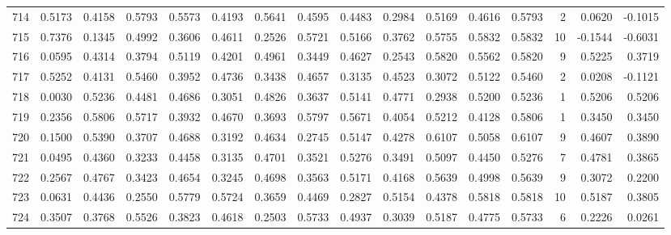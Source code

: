 \begin{tabular}{lrrrrrrrrrrrrrrr}
714 &      0.5173 &  0.4158 &  0.5793 &  0.5573 &  0.4193 &  0.5641 &  0.4595 &  0.4483 &  0.2984 &  0.5169 &   0.4616 &     0.5793 &      2 &                    0.0620 &                    -0.1015 \\
715 &      0.7376 &  0.1345 &  0.4992 &  0.3606 &  0.4611 &  0.2526 &  0.5721 &  0.5166 &  0.3762 &  0.5755 &   0.5832 &     0.5832 &     10 &                   -0.1544 &                    -0.6031 \\
716 &      0.0595 &  0.4314 &  0.3794 &  0.5119 &  0.4201 &  0.4961 &  0.3449 &  0.4627 &  0.2543 &  0.5820 &   0.5562 &     0.5820 &      9 &                    0.5225 &                     0.3719 \\
717 &      0.5252 &  0.4131 &  0.5460 &  0.3952 &  0.4736 &  0.3438 &  0.4657 &  0.3135 &  0.4523 &  0.3072 &   0.5122 &     0.5460 &      2 &                    0.0208 &                    -0.1121 \\
718 &      0.0030 &  0.5236 &  0.4481 &  0.4686 &  0.3051 &  0.4826 &  0.3637 &  0.5141 &  0.4771 &  0.2938 &   0.5200 &     0.5236 &      1 &                    0.5206 &                     0.5206 \\
719 &      0.2356 &  0.5806 &  0.5717 &  0.3932 &  0.4670 &  0.3693 &  0.5797 &  0.5671 &  0.4054 &  0.5212 &   0.4128 &     0.5806 &      1 &                    0.3450 &                     0.3450 \\
720 &      0.1500 &  0.5390 &  0.3707 &  0.4688 &  0.3192 &  0.4634 &  0.2745 &  0.5147 &  0.4278 &  0.6107 &   0.5058 &     0.6107 &      9 &                    0.4607 &                     0.3890 \\
721 &      0.0495 &  0.4360 &  0.3233 &  0.4458 &  0.3135 &  0.4701 &  0.3521 &  0.5276 &  0.3491 &  0.5097 &   0.4450 &     0.5276 &      7 &                    0.4781 &                     0.3865 \\
722 &      0.2567 &  0.4767 &  0.3423 &  0.4654 &  0.3245 &  0.4698 &  0.3563 &  0.5171 &  0.4168 &  0.5639 &   0.4998 &     0.5639 &      9 &                    0.3072 &                     0.2200 \\
723 &      0.0631 &  0.4436 &  0.2550 &  0.5779 &  0.5724 &  0.3659 &  0.4469 &  0.2827 &  0.5154 &  0.4378 &   0.5818 &     0.5818 &     10 &                    0.5187 &                     0.3805 \\
724 &      0.3507 &  0.3768 &  0.5526 &  0.3823 &  0.4618 &  0.2503 &  0.5733 &  0.4937 &  0.3039 &  0.5187 &   0.4775 &     0.5733 &      6 &                    0.2226 &                     0.0261 \\

\end{tabular}
